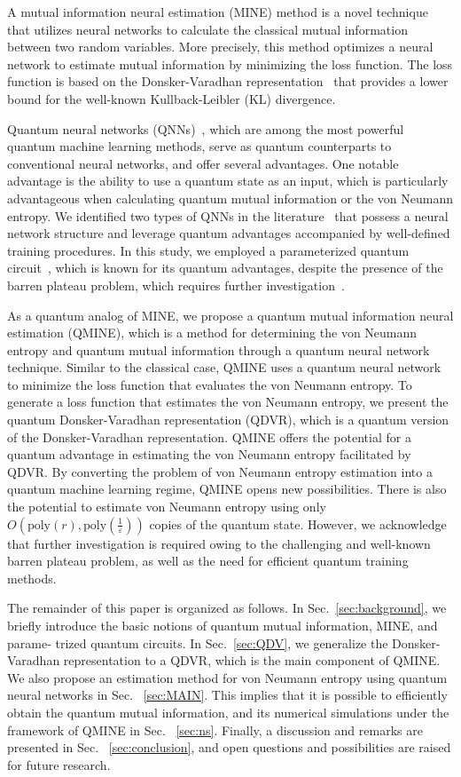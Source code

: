 \documentclass[aps,groupedaddress,superscriptaddress,amssymb,amsmath,amsbsy,amsfonts,twocolumn,pra]{revtex4}
\begin{document}
A mutual information neural estimation (MINE) method is a novel technique that utilizes neural networks to calculate the classical mutual information between two random variables. More precisely, this method optimizes a neural network to estimate mutual information by minimizing the loss function. The loss function is based on the Donsker-Varadhan representation~\cite{vN96} that provides a lower bound for the well-known Kullback-Leibler (KL) divergence.

Quantum neural networks (QNNs)~\cite{BBF+20,WDK+17}, which are among the most powerful quantum machine learning methods, serve as quantum counterparts to conventional neural networks, and offer several advantages. One notable advantage is the ability to use a quantum state as an input, which is particularly advantageous when calculating quantum mutual information or the von Neumann entropy. We identified two types of QNNs in the literature~\cite{BBF+20,BLSF19} that possess a neural network structure and leverage quantum advantages accompanied by well-defined training procedures. In this study, we employed a parameterized quantum circuit~\cite{BLSF19}, which is known for its quantum advantages, despite the presence of the barren plateau problem, which requires further investigation~\cite{MBS+18}.

As a quantum analog of MINE, we propose a quantum mutual information neural estimation (QMINE), which is a method for determining the von Neumann entropy and quantum mutual information through a quantum neural network technique. Similar to the classical case, QMINE uses a quantum neural network to minimize the loss function that evaluates the von Neumann entropy. To generate a loss function that estimates the von Neumann entropy, we present the quantum Donsker-Varadhan representation (QDVR), which is a quantum version of the Donsker-Varadhan representation. QMINE offers the potential for a quantum advantage in estimating the von Neumann entropy facilitated by QDVR. By converting the problem of von Neumann entropy estimation into a quantum machine learning regime, QMINE opens new possibilities. There is also the potential to estimate von Neumann entropy using only $O(\text{poly}(r), \text{poly}(\frac{1}{\varepsilon}))$ copies of the quantum state. However, we acknowledge that further investigation is required owing to the challenging and well-known barren plateau problem, as well as the need for efficient quantum training methods.

The remainder of this paper is organized as follows. In Sec.~\ref{sec:background}, we briefly introduce the basic notions of quantum mutual information, MINE, and parame-
trized quantum circuits. In Sec.~\ref{sec:QDV}, we generalize the Donsker-Varadhan representation to a QDVR, which is the main component of QMINE. We also propose an estimation method for von Neumann entropy using quantum neural networks in Sec. ~\ref{sec:MAIN}. This implies that it is possible to efficiently obtain the quantum mutual information, and its numerical simulations under the framework of QMINE in Sec. ~\ref{sec:ns}. Finally, a discussion and remarks are presented in Sec. ~\ref{sec:conclusion}, and open questions and possibilities are raised for future research.
\end{document}
